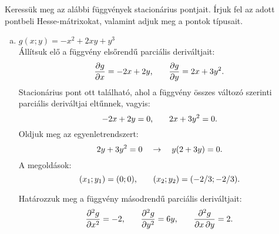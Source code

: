 \begin{exercise}{%
    Keressük meg az alábbi függvények stacionárius pontjait. Írjuk fel az adott
    pontbeli Hesse-mátrixokat, valamint adjuk meg a pontok típusait.
  }
{\begin{enumerate}[a)]
\begin{enumerate}[1)]
              \item Most vizsgáljuk meg a mátrix determinánsát $(2/3; -2/3)$
                    pontban:
                    \[
                      \det \rmat H(2/3;-2/3) = \begin{vmatrix}
                        2 & 2 \\ 2 & 4
                      \end{vmatrix} = 4 \text.
                    \]
                    Mivel a determináns pozitív, ezért a stacionárius pont
                    egy lehetséges szélsőérték hely. Mivel a Hesse-mátrix
                    összes aldeterminánsa pozitív ($h_{11} > 0$), ezért ebben
                    a pontban a függvénynek lokális minimuma van.
            \end{enumerate}

            Összegezve tehát:
            \begin{alignat*}{9}
              f & (0  ; 0  )  &  & = 0 \quad     &  & \rightarrow \quad
              \text{nyeregpont,}
              \\
              f & (2/3; -2/3) &  & = -4/27 \quad &  & \rightarrow \quad
              \text{lokális minimum.}
            \end{alignat*}

      \item $g(x; y) = -x^2 + 2xy + y^3$\\[2mm]
            Állítsuk elő a függvény elsőrendű parciális deriváltjait:
            \[
              \pdv{g}{x} = -2x + 2y
              \text,
              \qquad
              \pdv{g}{y} = 2x + 3y^2
              \text.
            \]
            Stacionárius pont ott található, ahol a függvény összes változó
            szerinti parciális deriváltjai eltűnnek, vagyis:
            \[
              -2x + 2y = 0
              \text,
              \qquad
              2x + 3y^2 = 0
              \text.
            \]
            Oldjuk meg az egyenletrendszert:
            \[
              2y + 3y^2 = 0
              \quad \rightarrow \quad
              y(2 + 3y) = 0
              \text.
            \]
            A megoldások:
            \[
              (x_1; y_1) = (0; 0)
              \text, \qquad
              (x_2; y_2) = (-2/3; -2/3)
              \text.
            \]

            Határozzuk meg a függvény másodrendű parciális deriváltjait:
            \[
              \pdv[order=2]{g}{x} = -2 \text,
              \qquad
              \pdv[order=2]{g}{y} = 6y \text,
              \qquad
              \pdv{g}{x,y}        = 2 \text.
            \]


\end{enumerate}}
\end{exercise}
